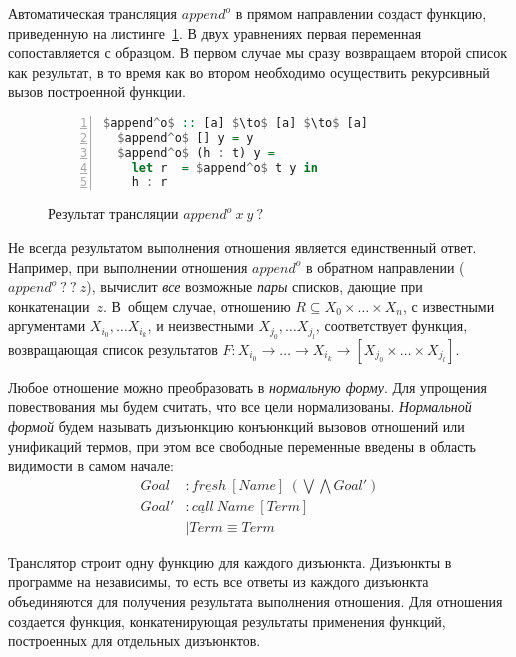 \documentclass[conference,american,russian]{IEEEtran}
\begin{document}
Автоматическая трансляция $append^o$ в прямом направлении создаст функцию, приведенную на листинге~\ref{lst:appendoFWD}. 
В двух уравнениях первая переменная сопоставляется с образцом. 
В первом случае мы сразу возвращаем второй список как результат, в то время как во втором необходимо осуществить рекурсивный вызов построенной функции. 

\begin{figure}[h!]
  \begin{center}
  \begin{minipage}{0.35\textwidth}
  \begin{lstlisting}[language=Haskell, frame=single, numbers=left,numberstyle=\small, escapechar=|]
  $append^o$ :: [a] $\to$ [a] $\to$ [a]
  $append^o$ [] y = y
  $append^o$ (h : t) y =
    let r  = $append^o$ t y in 
    h : r 
  \end{lstlisting}
  \end{minipage}
  \end{center}
  \caption{Результат трансляции $append^o \ x \ y \ ?$}
  \label{lst:appendoFWD}
\end{figure}

Не всегда результатом выполнения отношения является единственный ответ.
Например, при выполнении отношения $append^o$ в обратном направлении ($append^o \ ? \ ? \ z$), \miniKanren{} вычислит \emph{все} возможные \emph{пары} списков, дающие при конкатенации~$z$. 
В~общем случае, отношению $R \subseteq X_0 \times \dots \times X_n$, с известными аргументами $X_{i_0}, \dots X_{i_k}$, и неизвестными $X_{j_0}, \dots X_{j_l}$, соответствует функция, возвращающая список результатов $F : X_{i_0} \to \dots \to X_{i_k} \to [X_{j_0} \times \dots \times X_{j_l}]$. 

Любое отношение можно преобразовать в \emph{нормальную форму}. 
Для упрощения повествования мы будем считать, что все цели нормализованы. 
\emph{Нормальной формой} будем называть дизъюнкцию конъюнкций вызовов отношений или унификаций термов, при этом все свободные переменные введены в область видимости в самом начале:
\begin{align*}
  Goal  &: \underline{fresh} \ [Name] \ (\bigvee \bigwedge Goal') \\
  Goal' &: \underline{call} \ Name \ [Term] \\
        &\mid Term \equiv Term 
\end{align*}

Транслятор строит одну функцию для каждого дизъюнкта. 
Дизъюнкты в программе на \miniKanren{} независимы, то есть все ответы из каждого дизъюнкта объединяются для получения результата выполнения отношения. 
Для отношения создается функция, конкатенирующая результаты применения функций, построенных для отдельных дизъюнктов. 
\end{document}
